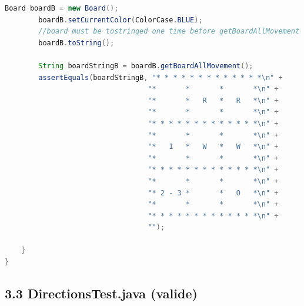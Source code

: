 \documentclass[a4paper,11pt]{article}
\begin{document}
\begin{lstlisting}[language=Java]
        Board boardB = new Board();
        boardB.setCurrentColor(ColorCase.BLUE);
        //board must be tostringed one time before getBoardAllMovement
        boardB.toString();
        
        String boardStringB = boardB.getBoardAllMovement();
        assertEquals(boardStringB, "* * * * * * * * * * * * *\n" + 
                                  "*       *       *       *\n" + 
                                  "*       *   R   *   R   *\n" + 
                                  "*       *       *       *\n" + 
                                  "* * * * * * * * * * * * *\n" + 
                                  "*       *       *       *\n" + 
                                  "*   1   *   W   *   W   *\n" + 
                                  "*       *       *       *\n" + 
                                  "* * * * * * * * * * * * *\n" + 
                                  "*       *       *       *\n" + 
                                  "* 2 - 3 *       *   O   *\n" + 
                                  "*       *       *       *\n" + 
                                  "* * * * * * * * * * * * *\n" + 
                                  "");

    }
}


\end{lstlisting}
\newpage
\subsection{3.3 DirectionsTest.java (valide)}
\end{document}
